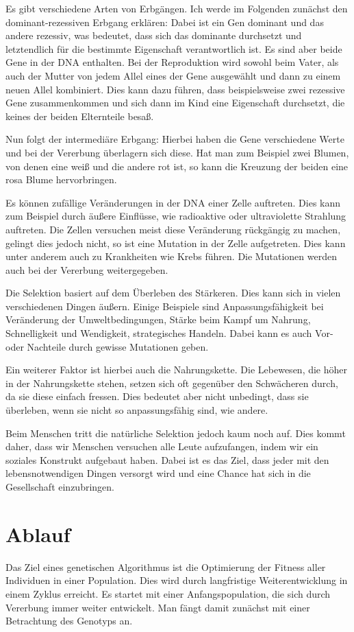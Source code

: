 Es gibt verschiedene Arten von Erbgängen. Ich werde im Folgenden zunächst den dominant-rezessiven Erbgang erklären:
Dabei ist ein Gen dominant und das andere rezessiv, was bedeutet, dass sich das dominante durchsetzt und letztendlich für die bestimmte Eigenschaft verantwortlich ist. Es sind aber beide Gene in der DNA enthalten. Bei der Reproduktion wird sowohl beim Vater, als auch der Mutter von jedem Allel eines der Gene ausgewählt und dann zu einem neuen Allel kombiniert. Dies kann dazu führen, dass beispielsweise zwei rezessive Gene zusammenkommen und sich dann im Kind eine Eigenschaft durchsetzt, die keines der beiden Elternteile besaß.

Nun folgt der intermediäre Erbgang:
Hierbei haben die Gene verschiedene Werte und bei der Vererbung überlagern sich diese. Hat man zum Beispiel zwei Blumen, von denen eine weiß und die andere rot ist, so kann die Kreuzung der beiden eine rosa Blume hervorbringen.

Es können zufällige Veränderungen in der DNA einer Zelle auftreten. Dies kann zum Beispiel durch äußere Einflüsse, wie radioaktive oder ultraviolette Strahlung auftreten. Die Zellen versuchen meist diese Veränderung rückgängig zu machen, gelingt dies jedoch nicht, so ist eine Mutation in der Zelle aufgetreten. Dies kann unter anderem auch zu Krankheiten wie Krebs führen. Die Mutationen werden auch bei der Vererbung weitergegeben.

Die Selektion basiert auf dem Überleben des Stärkeren. Dies kann sich in vielen verschiedenen Dingen äußern. Einige Beispiele sind Anpassungsfähigkeit bei Veränderung der Umweltbedingungen, Stärke beim Kampf um Nahrung, Schnelligkeit und Wendigkeit, strategisches Handeln. Dabei kann es auch Vor- oder Nachteile durch gewisse Mutationen geben.

Ein weiterer Faktor ist hierbei auch die Nahrungskette. Die Lebewesen, die höher in der Nahrungskette stehen, setzen sich oft gegenüber den Schwächeren durch, da sie diese einfach fressen. Dies bedeutet aber nicht unbedingt, dass sie überleben, wenn sie nicht so anpassungsfähig sind, wie andere.

Beim Menschen tritt die natürliche Selektion jedoch kaum noch auf. Dies kommt daher, dass wir Menschen versuchen alle Leute aufzufangen, indem wir ein soziales Konstrukt aufgebaut haben. Dabei ist es das Ziel, dass jeder mit den lebensnotwendigen Dingen versorgt wird und eine Chance hat sich in die Gesellschaft einzubringen.

\section{Ablauf}
Das Ziel eines genetischen Algorithmus ist die Optimierung der Fitness aller Individuen in einer Population. Dies wird durch langfristige Weiterentwicklung in einem Zyklus erreicht.
Es startet mit einer Anfangspopulation, die sich durch Vererbung immer weiter entwickelt. Man fängt damit zunächst mit einer Betrachtung des Genotyps an.

